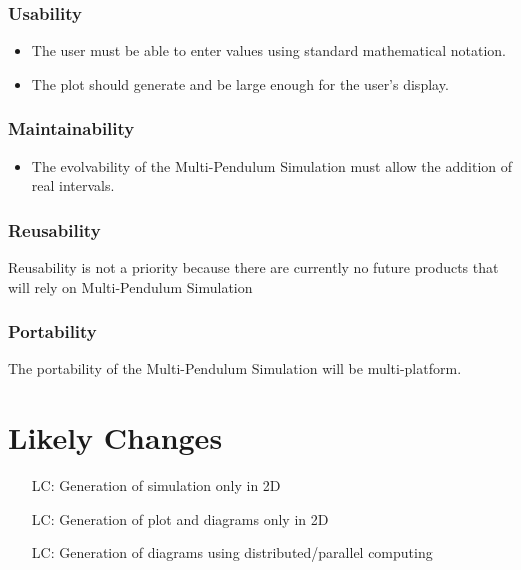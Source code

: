 \documentclass[12pt]{article}
\newcounter{lcnum} %
\newcommand{\progname}{Multi-Pendulum Simulation }
\begin{document}
\subsubsection*{Usability}
\begin{itemize}
	\item The user must be able to enter values using standard mathematical 
	notation.

	\item The plot should generate and be large enough for the user's display.
\end{itemize}

\subsubsection*{Maintainability}
\begin{itemize}
	\item The evolvability of the \progname must allow the addition 
	of real intervals.
\end{itemize}

\subsubsection*{Reusability}
Reusability is not a priority because there are currently no future products 
that will rely on \progname

\subsubsection*{Portability}
The portability of the \progname will be multi-platform.

\newpage

\section{Likely Changes}    

\noindent \begin{itemize}

\item[LC\refstepcounter{lcnum}\thelcnum \label{only2dsim}:] Generation of simulation only in 2D
\item[LC\refstepcounter{lcnum}\thelcnum \label{only2dplot}:] Generation of plot and diagrams only in 2D
\item[LC\refstepcounter{lcnum}\thelcnum \label{maybe-mpi}:] Generation of diagrams 
  using distributed/parallel computing

\end{itemize}
\end{document}

